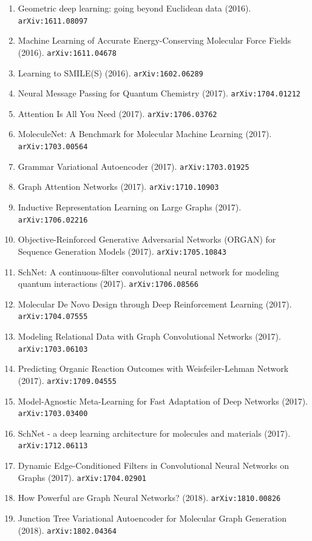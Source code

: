 \documentclass[11pt]{article}
\begin{document}
\begin{enumerate}
  \item Geometric deep learning: going beyond Euclidean data (2016). \texttt{arXiv:1611.08097}
  \item Machine Learning of Accurate Energy-Conserving Molecular Force Fields (2016). \texttt{arXiv:1611.04678}
  \item Learning to SMILE(S) (2016). \texttt{arXiv:1602.06289}
  \item Neural Message Passing for Quantum Chemistry (2017). \texttt{arXiv:1704.01212}
  \item Attention Is All You Need (2017). \texttt{arXiv:1706.03762}
  \item MoleculeNet: A Benchmark for Molecular Machine Learning (2017). \texttt{arXiv:1703.00564}
  \item Grammar Variational Autoencoder (2017). \texttt{arXiv:1703.01925}
  \item Graph Attention Networks (2017). \texttt{arXiv:1710.10903}
  \item Inductive Representation Learning on Large Graphs (2017). \texttt{arXiv:1706.02216}
  \item Objective-Reinforced Generative Adversarial Networks (ORGAN) for
  Sequence Generation Models (2017). \texttt{arXiv:1705.10843}
  \item SchNet: A continuous-filter convolutional neural network for modeling
  quantum interactions (2017). \texttt{arXiv:1706.08566}
  \item Molecular De Novo Design through Deep Reinforcement Learning (2017). \texttt{arXiv:1704.07555}
  \item Modeling Relational Data with Graph Convolutional Networks (2017). \texttt{arXiv:1703.06103}
  \item Predicting Organic Reaction Outcomes with Weisfeiler-Lehman Network (2017). \texttt{arXiv:1709.04555}
  \item Model-Agnostic Meta-Learning for Fast Adaptation of Deep Networks (2017). \texttt{arXiv:1703.03400}
  \item SchNet - a deep learning architecture for molecules and materials (2017). \texttt{arXiv:1712.06113}
  \item Dynamic Edge-Conditioned Filters in Convolutional Neural Networks on
  Graphs (2017). \texttt{arXiv:1704.02901}
  \item How Powerful are Graph Neural Networks? (2018). \texttt{arXiv:1810.00826}
  \item Junction Tree Variational Autoencoder for Molecular Graph Generation (2018). \texttt{arXiv:1802.04364}

\end{enumerate}
\end{document}
